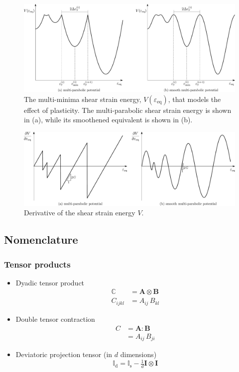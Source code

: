 \documentclass[times,namecite]{goose-article}
\begin{document}
\begin{figure}[htp]
  \centering
  \includegraphics[width=1.\textwidth]{figures/potential_V-plas}
  \caption{The multi-minima shear strain energy, $V ( \varepsilon_\mathrm{eq} )$, that models the effect of plasticity. The multi-parabolic shear strain energy is shown in (a), while its smoothened equivalent is shown in (b).}
  \label{fig:V:plas}
\end{figure}

\begin{figure}[htp]
  \centering
  \includegraphics[width=1.\textwidth]{figures/potential_dV-plas}
  \caption{Derivative of the shear strain energy $V$.}
  \label{fig:dV:plas}
\end{figure}

\subsection{Nomenclature}
\label{sec:nomenclature}

\subsubsection{Tensor products}
\label{sec:nomenclature:tensor}

\begin{itemize}
%
\item Dyadic tensor product
\begin{align}
  \mathbb{C} &= \bm{A} \otimes \bm{B} \\
  C_{ijkl}   &= A_{ij} \,      B_{kl}
\end{align}
%
\item Double tensor contraction
\begin{align}
  C &= \bm{A} : \bm{B} \\
    &= A_{ij} \, B_{ji}
\end{align}
%
\item Deviatoric projection tensor (in $d$ dimensions)
\begin{equation}
  \mathbb{I}_\mathrm{d}
  = \mathbb{I}_\mathrm{s} - \tfrac{1}{d} \bm{I} \otimes \bm{I}
\end{equation}
%
\end{itemize}
\end{document}
